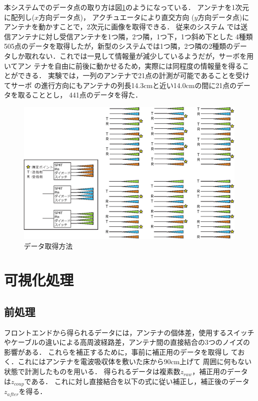 ﻿\documentclass[12pt,oneside]{jsbook}
\begin{document}
本システムでのデータ点の取り方は図\ref{so2get}のようになっている．
アンテナを1次元に配列し($x$方向データ点)，
アクチュエータにより直交方向
($y$方向データ点)にアンテナを動かすことで，2次元に画像を取得できる．
従来のシステム
では送信アンテナに対し受信アンテナを1つ隣，2つ隣，1つ下，1つ斜め下とした
4種類505点のデータを取得したが，新型のシステムでは1つ隣，2つ隣の2種類のデー
タしか取れない．これでは一見して情報量が減少しているようだが，サーボを用いてアン
テナを自由に前後に動かせるため，実際には同程度の情報量を得ることができる．
実験では，一列のアンテナで21点の計測が可能であることを受けてサーボ
の進行方向にもアンテナの列長14.3cmと近い14.0cmの間に21点のデータを取ることとし，
441点のデータを得た．
\begin{figure}[btp]
 \begin{center}
 \includegraphics[width =\hsize ]{switch-circuit2.eps}
\caption{データ取得方法}
\label{so2get}
 \end{center}
\end{figure}

\newpage
\section{可視化処理}
\label{021920_15Feb15}
\subsection{前処理}
フロントエンドから得られるデータには，アンテナの個体差，使用するスイッチ
やケーブルの違いによる高周波経路差，アンテナ間の直接結合の3つのノイズの影響がある．
これらを補正するために，事前に補正用のデータを取得し
ておく．これにはアンテナを電波吸収体を敷いた床から90cm上げて
周囲に何もない状態で計測したものを用いる．
得られるデータは複素数$z_{raw}$，補正用のデータは$z_{coup}$である．
これに対し直接結合を以下の式に従い補正し，補正後のデータ$z_{after}$を得る．
\end{document}
